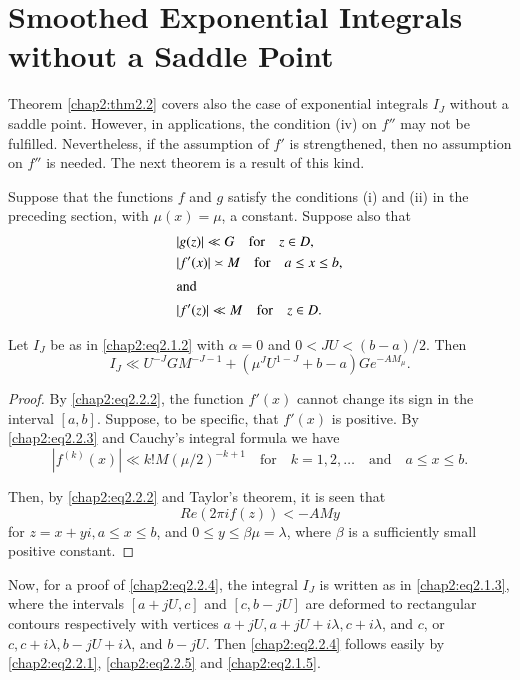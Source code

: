 \section{Smoothed Exponential Integrals without a Saddle
  Point}\label{chap2:sec2.2} 

Theorem \ref{chap2:thm2.2} covers also the case of exponential
integrals $I_J$ without a saddle point. However, in applications, the
condition (iv) on $f''$ may not be fulfilled. Nevertheless, if the
assumption of $f'$ is strengthened, then no assumption on $f''$ is
needed. The next theorem is a result of this kind.

\begin{thm}\label{chap2:thm2.3}
Suppose that the functions $f$ and $g$ satisfy the conditions (i) and
(ii) in the preceding section, with $\mu(x)=\mu$, a constant. Suppose
also that
\begin{align}
& |g(z)|\ll G\quad\text{for}\quad z\in D,\label{chap2:eq2.2.1}\\
& |f'(x)|\asymp M\quad\text{for}\quad a\leq x\leq
b,\label{chap2:eq2.2.2}\\
\intertext{and}
& |f'(z)|\ll M\quad\text{for}\quad z\in D.\label{chap2:eq2.2.3}
\end{align}

Let $I_J$ be as in \eqref{chap2:eq2.1.2} with $\alpha =0$ and $0 < JU
< (b-a)/2$. Then 
\begin{equation}\label{chap2:eq2.2.4}
I_J\ll U^{-J}GM^{-J-1}+\left(\mu^JU^{1-J}+b-a\right)Ge^{-AM_\mu}.
\end{equation}
\end{thm}

\begin{proof}
By \eqref{chap2:eq2.2.2}, the function $f'(x)$ cannot change its sign
in the interval $[a,b]$. Suppose, to be specific, that $f'(x)$ is
positive. By \eqref{chap2:eq2.2.3} and Cauchy's integral formula we
have 
$$
|f^{(k)}(x)|\ll k!M(\mu/2)^{-k+1}\quad\text{for}\quad k=1,2,\ldots
\quad\text{and}\quad a\leq x\leq b.
$$

Then, by \eqref{chap2:eq2.2.2} and Taylor's theorem, it is seen that 
\begin{equation}\label{chap2:eq2.2.5}
Re(2\pi i f(z))< -AMy
\end{equation}\pageoriginale
for $z=x+yi,a\leq x\leq b$, and $0\leq y\leq\beta\mu=\lambda$, where
$\beta$ is a sufficiently small positive constant.
\end{proof}

Now, for a proof of \eqref{chap2:eq2.2.4}, the integral $I_J$ is
written as in \eqref{chap2:eq2.1.3}, where the intervals $[a+jU,c]$
and $[c,b-jU]$ are deformed to rectangular contours respectively with
vertices $a+jU, a+jU+i\lambda, c+i\lambda$, and $c$, or $c,
c+i\lambda, b-jU+i\lambda$, and $b-jU$. Then \eqref{chap2:eq2.2.4}
follows easily by \eqref{chap2:eq2.2.1}, \eqref{chap2:eq2.2.5} and
\eqref{chap2:eq2.1.5}. 

